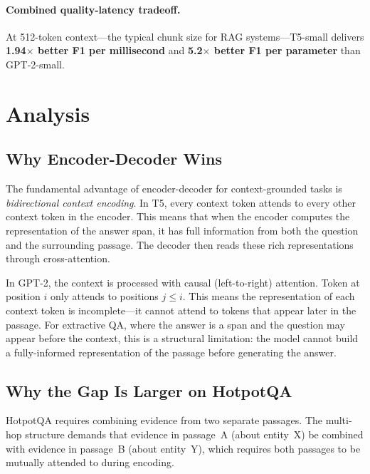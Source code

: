 \documentclass[11pt]{article}
\newcommand{\hotpotqa}{HotpotQA\xspace}
\begin{document}
\paragraph{Combined quality-latency tradeoff.}
At 512-token context---the typical chunk size for RAG systems---T5-small delivers
\textbf{1.94$\times$ better F1 per millisecond} and \textbf{5.2$\times$ better F1
per parameter} than GPT-2-small.

\section{Analysis}

\subsection{Why Encoder-Decoder Wins}

The fundamental advantage of encoder-decoder for context-grounded tasks is
\emph{bidirectional context encoding}.
In T5, every context token attends to every other context token in the encoder.
This means that when the encoder computes the representation of the answer span,
it has full information from both the question and the surrounding passage.
The decoder then reads these rich representations through cross-attention.

In GPT-2, the context is processed with causal (left-to-right) attention.
Token at position $i$ only attends to positions $j \leq i$.
This means the representation of each context token is incomplete---it cannot
attend to tokens that appear later in the passage.
For extractive QA, where the answer is a span and the question may appear before
the context, this is a structural limitation: the model cannot build a
fully-informed representation of the passage before generating the answer.

\subsection{Why the Gap Is Larger on HotpotQA}

\hotpotqa requires combining evidence from two separate passages.
The multi-hop structure demands that evidence in passage~A (about entity~X)
be combined with evidence in passage~B (about entity~Y), which requires both
passages to be mutually attended to during encoding.
\end{document}

